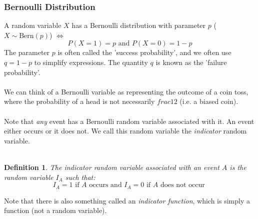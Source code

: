 \documentclass[12pt]{article} %
\newtheorem{defn}{Definition}
\begin{document}
\subsubsection{Bernoulli Distribution}
A random variable $X$ has a Bernoulli distribution with parameter $p$ ($X \sim \textrm{Bern}(p)$) $\iff$ 
$$P(X=1) = p \textrm{ and } P(X=0) = 1-p$$
The parameter $p$ is often called the 'success probability', and we often use $q=1-p$ to simplify expressions. The quantity $q$ is known as the 'failure probability'.\\\\
We can think of a Bernoulli variable as representing the outcome of a coin toss, where the probability of a head is not necessarily $frac12$ (i.e. a biased coin).\\\\
Note that \emph{any} event has a Bernoulli random variable associated with it. An event either occurs or it does not. We call this random variable the \emph{indicator} random variable.\\\\
\begin{defn}
The \emph{indicator} random variable associated with an event $A$ is the random variable $I_A$ such that:
$$I_A = 1 \textrm{ if } A \textrm{ occurs and } I_A = 0 \textrm{ if } A \textrm{ does not occur }$$
\end{defn} 
Note that there is also something called an \emph{indicator function}, which is simply a function (not a random variable).\\\\
\end{document}
